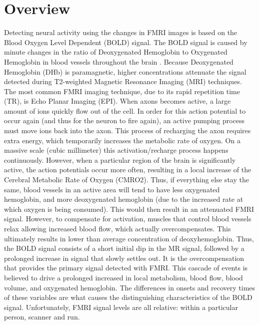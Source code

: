 \section{Overview}
\label{sec:Introduction Overview}
Detecting neural activity using the changes in FMRI images is based on 
the Blood Oxygen Level Dependent (BOLD) signal.
The BOLD signal is caused by minute changes in the ratio of Deoxygenated
Hemoglobin to Oxygenated Hemoglobin in blood vessels throughout the brain \cite{Ogawa}.
Because Deoxygenated Hemoglobin (DHb) is paramagnetic, higher concentrations
attenuate the signal detected during T2-weighted Magnetic Resonance Imaging (MRI)
techniques. The most common FMRI imaging technique, due to its rapid repetition 
time (TR), is Echo Planar Imaging (EPI). When axons becomes active,
a large amount of ions quickly flow out of the cell. In order for this
action potential to occur again (and thus for the neuron to fire again),
an active pumping process must move ions back into the
axon. This process of recharging the axon requires extra energy, which temporarily
increases the metabolic rate of oxygen. On a massive scale (cubic millimeter) 
this activation/recharge process happens continuously. However, when a 
particular region of the brain is significantly active, the action potentials
occur more often, resulting in a local increase of the 
Cerebral Metabolic Rate of Oxygen (CMRO2). Thus, if everything else 
stay the same, blood vessels in an active area will 
tend to have less oxygenated hemoglobin, and more deoxygenated hemoglobin
(due to the increased rate at which oxygen is being consumed).
This would then result in an attenuated FMRI signal. However, to
compensate for activation, muscles that
control blood vessels relax allowing increased blood flow,
which actually overcompensates.
This ultimately results in lower than average concentration of 
deoxyhemoglobin. Thus, the BOLD signal consists of a short initial
dip in the MR signal, followed by a prolonged increase in signal
that slowly settles out. It is the overcompensation that provides
the  primary signal detected with FMRI. This cascade of events
is believed to drive a prolonged increased in local metabolism, 
blood flow, blood volume, and oxygenated hemoglobin. The differences
in onsets and recovery times of these variables are what causes the 
distinguishing characteristics of the BOLD signal. Unfortunately, 
FMRI signal levels are all relative: within a particular
person, scanner and run. 

